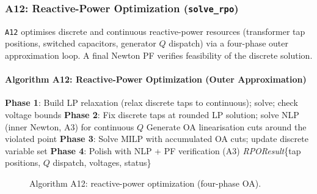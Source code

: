 \subsubsection{A12: Reactive-Power Optimization (\texttt{solve\_rpo})}
\label{algo:a12}

\texttt{A12} optimises discrete and continuous reactive-power resources
(transformer tap positions, switched capacitors, generator $Q$ dispatch)
via a four-phase outer approximation loop.  A final Newton PF verifies
feasibility of the discrete solution.

\paragraph{Algorithm A12: Reactive-Power Optimization (Outer Approximation)}
\begin{algorithmic}[1]
  \State \textbf{Phase 1}: Build LP relaxation (relax discrete taps to continuous);
    solve; check voltage bounds
  \State \textbf{Phase 2}: Fix discrete taps at rounded LP solution;
    solve NLP (inner Newton, A3) for continuous $Q$
    \State Generate OA linearisation cuts around the violated point
  \EndIf
  \State \textbf{Phase 3}: Solve MILP with accumulated OA cuts;
    update discrete variable set
  \State \textbf{Phase 4}: Polish with NLP + PF verification (A3)
  \State \Return \textit{RPOResult}\{tap positions, $Q$ dispatch, voltages, status\}
\EndProcedure
\end{algorithmic}

\begin{figure}[H]
\centering
{}
\caption{Algorithm A12: reactive-power optimization (four-phase OA).}
\label{fig:a12-flow}
\end{figure}


